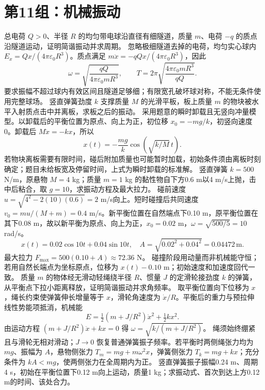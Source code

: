\section{第11组：机械振动}
\problemtext 总电荷 $Q>0$、半径 $R$ 的均匀带电球沿直径有细隧道，质量 $m$、电荷 $-q$ 的质点沿隧道运动，证明简谐振动并求周期。
\workings 忽略极细隧道去掉的电荷，均匀实心球内 $E_x=Qx/(4\pi\varepsilon_0R^3)$。质点满足 $m\ddot x=-qQx/(4\pi\varepsilon_0R^3)$，因此
\[
\omega=\sqrt{\frac{qQ}{4\pi\varepsilon_0mR^3}},\qquad
T=2\pi\sqrt{\frac{4\pi\varepsilon_0mR^3}{qQ}}.
\]
\crosscheck 要求振幅不超过球内有效区间且隧道足够细；有限宽孔破坏球对称，不能无条件使用完整球场。
\problemtext 竖直弹簧劲度 $k$ 支撑质量 $M$ 的光滑平板，板上质量 $m$ 的物块被水平入射质点击中并离板，求板之后的振动。
\workings 采用题意的瞬时卸载且无竖向冲量模型。以卸载后的平衡位置为原点、向上为正，初位移 $x_0=-mg/k$，初竖向速度0。卸载后 $M\ddot x=-kx$，所以
\[
x(t)=-\frac{mg}{k}\cos\left(\sqrt{k/M}\,t\right).
\]
\crosscheck 若物块离板需要有限时间，碰后附加质量也可能暂时加载，初始条件须由离板时刻确定；题目未给板宽及停留时间，上式为瞬时卸载的标准解。
\problemtext 竖直弹簧 $k=500$ N/m，原悬物 $M=4$ kg；质量 $m=1$ kg 的黏性物自下方0.6 m以4 m/s上抛，击中后粘合，取 $g=10$，求振动方程及最大拉力。
\workings 碰前速度 $u=\sqrt{4^2-2(10)(0.6)}=2$ m/s向上。短时碰撞后共同速度 $v_0=mu/(M+m)=0.4$ m/s。新平衡位置在自然端点下0.10 m，原平衡位置在其下0.08 m，故以新平衡为原点、向上为正，$x_0=0.02$ m，$\omega=\sqrt{500/5}=10$ rad/s。
\[
x(t)=0.02\cos10t+0.04\sin10t,\quad
A=\sqrt{0.02^2+0.04^2}=0.04472\,\mathrm m.
\]
最大拉力 $F_{\max}=500(0.10+A)\approx72.36$ N。
\crosscheck 碰撞阶段用动量而非机械能守恒；若用自然长端点为坐标原点，位移为 $x(t)-0.10$ m；初始速度和加速度回代一致。
\problemtext 质量 $m$ 的物体经无滑动轻绳绕半径 $R$、惯量 $J$ 的定滑轮接劲度 $k$ 的弹簧，从平衡点下拉小距离释放，证明简谐振动并求角频率。
\workings 取平衡位置向下位移为 $x$，绳长约束使弹簧伸长增量等于 $x$，滑轮角速度为 $\dot x/R$。平衡后的重力与预拉伸线性势能项抵消，机械能
\[
E=\tfrac12(m+J/R^2)\dot x^2+\tfrac12kx^2.
\]
由运动方程 $(m+J/R^2)\ddot x+kx=0$ 得 $\omega=\sqrt{k/(m+J/R^2)}$。
\crosscheck 绳须始终绷紧且与滑轮无相对滑动；$J\to0$ 恢复普通弹簧振子频率。若平衡时两侧绳张力均为 $mg$、振幅为 $A$，悬物侧张力 $T_m=mg+m\omega^2x$，弹簧侧张力 $T_k=mg+kx$；充分条件为 $kA<mg$，使两侧张力在全周期内为正。
\problemtext 竖直弹簧振子振幅0.24 m、周期4 s，初始在平衡位置下0.12 m向上运动，质量1 kg；求振动式、首次到达上方0.12 m的时间、该处合力。
